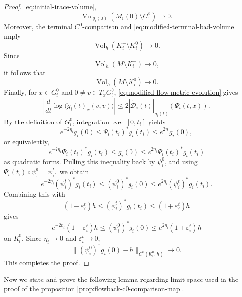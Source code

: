 \documentclass{amsart}
\begin{document}
\begin{proof}
\eqref{eq:initial-trace-volume},
\[
        \operatorname{Vol}_{g_i(0)}
        (M_i(0)\setminus G_i^0)\to0.
\]
Moreover, the terminal \(C^0\)-comparison and
\eqref{eq:modified-terminal-bad-volume} imply
\[
        \operatorname{Vol}_h(K_i^-\setminus K_i^0)\to0.
\]
Since
\[
        \operatorname{Vol}_h(M\setminus K_i^-)\to0,
\]
it follows that
\[
        \operatorname{Vol}_h(M\setminus K_i^0)\to0.
\]
Finally, for \(x\in G_i^0\) and \(0\neq v\in T_xG_i^0\),
\eqref{eq:modified-flow-metric-evolution} gives
\[
        \left|
        \frac{d}{dt}
        \log\bigl(\check g_i(t)_x(v,v)\bigr)
        \right|
        \leq
        2|\widetilde{\mathcal D}_i(t)|_{g_i(t)}
        (\Psi_i(t,x)).
\]
By the definition of \(G_i^0\), integration over \([0,t_i]\) yields
\[
        e^{-2\eta_i}g_i(0)
        \leq
        \Psi_i(t_i)^*g_i(t_i)
        \leq
        e^{2\eta_i}g_i(0),
\]
or equivalently,
\[
        e^{-2\eta_i}\Psi_i(t_i)^*g_i(t_i)
        \leq
        g_i(0)
        \leq
        e^{2\eta_i}\Psi_i(t_i)^*g_i(t_i)
\]
as quadratic forms.
Pulling this inequality back by \(\psi_i^0\), and using
$\Psi_i(t_i)\circ\psi_i^0=\psi_i^t,$
we obtain
\[
        e^{-2\eta_i}(\psi_i^t)^*g_i(t_i)
        \leq
        (\psi_i^0)^*g_i(0)
        \leq
        e^{2\eta_i}(\psi_i^t)^*g_i(t_i).
\]
Combining this with
\[
        (1-\varepsilon_i^t)h
        \leq
        (\psi_i^t)^*g_i(t_i)
        \leq
        (1+\varepsilon_i^t)h
\]
gives
\[
        e^{-2\eta_i}(1-\varepsilon_i^t)h
        \leq
        (\psi_i^0)^*g_i(0)
        \leq
        e^{2\eta_i}(1+\varepsilon_i^t)h
\]
on \(K_i^0\). Since
\(\eta_i\to0\) and \(\varepsilon_i^t\to0\),
\[
        \|(\psi_i^0)^*g_i(0)-h
        \|_{C^0(K_i^0,h)}
        \longrightarrow0.
\]
This completes the proof.
\end{proof}
\noindent Now we state and prove the following lemma regarding limit space used in the proof of the proposition \ref{prop:flowback-c0-comparison-map}.
\end{document}
